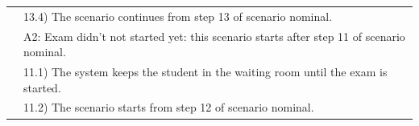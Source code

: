 \documentclass[]{uc2pfecaneva}
\begin{document}
\begin{table}[h]
\begin{tabularx}{\textwidth}{|l|X|}
            & \hspace{4mm}13.4) The scenario continues from step 13 of scenario nominal.                        \\
            & A2: Exam didn't not started yet: this scenario starts after step 11 of scenario nominal.          \\
            & \hspace{4mm}11.1) The system keeps the student in the waiting room until the exam is started.     \\
            & \hspace{4mm}11.2) The scenario starts from step 12 of scenario nominal.                           \\ \hline
        \end{tabularx}

        \label{table:4}
    \end{table}
    \clearpage
\end{document}
